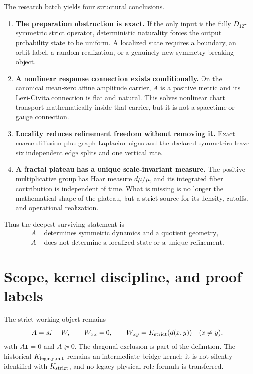 \documentclass[11pt,a4paper]{article}
\begin{document}
The research batch yields four structural conclusions.

\begin{enumerate}
\item \textbf{The preparation obstruction is exact.} If the only input is the fully
$D_{12}$-symmetric strict operator, deterministic naturality forces the output probability
state to be uniform. A localized state requires a boundary, an orbit label, a random
realization, or a genuinely new symmetry-breaking object.
\item \textbf{A nonlinear response connection exists conditionally.} On the canonical
mean-zero affine amplitude carrier, $A$ is a positive metric and its Levi-Civita connection
is flat and natural. This solves nonlinear chart transport mathematically inside that
carrier, but it is not a spacetime or gauge connection.
\item \textbf{Locality reduces refinement freedom without removing it.} Exact coarse
diffusion plus graph-Laplacian signs and the declared symmetries leave six independent edge
splits and one vertical rate.
\item \textbf{A fractal plateau has a unique scale-invariant measure.} The positive
multiplicative group has Haar measure $d\mu/\mu$, and its integrated fiber contribution is
independent of time. What is missing is no longer the mathematical shape of the plateau,
but a strict source for its density, cutoffs, and operational realization.
\end{enumerate}

Thus the deepest surviving statement is
\begin{align*}
A&\text{ determines symmetric dynamics and a quotient geometry},\\
A&\text{ does not determine a localized state or a unique refinement}.
\end{align*}

\section{Scope, kernel discipline, and proof labels}

The strict working object remains
\[
A=sI-W,\qquad W_{xx}=0,\qquad
W_{xy}=K_{\rm strict}(d(x,y))\quad(x\ne y),
\]
with $A\bm1=0$ and $A\succeq0$. The diagonal exclusion is part of the definition. The
historical $K_{\rm legacy,ont}$ remains an intermediate bridge kernel; it is not silently
identified with $K_{\rm strict}$, and no legacy physical-role formula is transferred.
\end{document}
